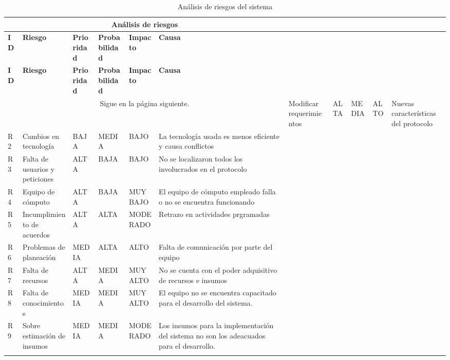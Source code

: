 \begin{longtable}{| p{1cm} | p{4cm} | p{2cm} | p{2.5cm} | p{2cm} | p{4cm} |}

\hline
\multicolumn{6}{|c|}{\textbf{Análisis de riesgos}} \\ \hline
\textbf{ID} &  \textbf{Riesgo} & \textbf{Prioridad} & \textbf{Probabilidad} & \textbf{Impacto} & \textbf{Causa}\\
\hline \hline
\endfirsthead

\hline
\textbf{ID} &  \textbf{Riesgo} & \textbf{Prioridad} & \textbf{Probabilidad} & \textbf{Impacto} & \textbf{Causa}\\
\hline \hline
\endhead

\multicolumn{6}{|c|}{Sigue en la página siguiente.}
\endfoot

\endlastfoot

R1 & Modificar requerimientos &  ALTA & MEDIA & ALTO & Nuevas características del protocolo \\ \hline
R2 & Cambios en tecnología & BAJA & MEDIA & BAJO & La tecnología usada es menos eficiente y causa conflictos \\ \hline
R3 & Falta de usuarios y peticiones & ALTA & BAJA &  BAJO & No se localizaron todos los involucrados en el protocolo \\ \hline
R4 & Equipo de cómputo & ALTA & BAJA & MUY BAJO & El equipo de cómputo empleado falla o no se encuentra funcionando \\ \hline
R5 & Incumplimiento de acuerdos & ALTA & ALTA & MODERADO & Retrazo en actividades prgramadas \\ \hline
R6 & Problemas de planeación & MEDIA & ALTA & ALTO & Falta de comunicación por parte del equipo \\ \hline
R7 & Falta de recursos & ALTA & MEDIA & MUY ALTO & No se cuenta con el poder adquisitivo de recursos e insumos \\ \hline
R8 & Falta de conocimientos & MEDIA & MEDIA & MUY ALTO & El equipo no se encuentra capacitado para el desarrollo del sistema. \\ \hline
R9 & Sobre estimación de insumos & MEDIA & MEDIA & MODERADO & Los insumos para la implementación del sistema no son los adeacuados para el desarrollo. 

\\ \hline
\caption{Análisis de riesgos del sistema}
\label{Análisis de riesgos }
\end{longtable}

